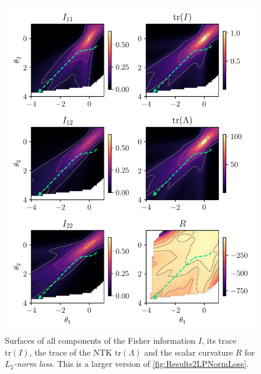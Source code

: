 \begin{figure}
	\centering
	\includegraphics{Experiment2/plots/LPNormLoss2_tracecomparison_Big.pdf}
	\caption{Surfaces of all components of the Fisher information $I$, its trace $\mathrm{tr}(I)$, the trace of the NTK $\mathrm{tr}(\Lambda)$ and the scalar curvature $R$ for \emph{$L_2$-norm loss}. This is a larger version of \cref{fig:Results2LPNormLoss}.}
	\label{fig:Results2LPNormLossBig}
\end{figure}

